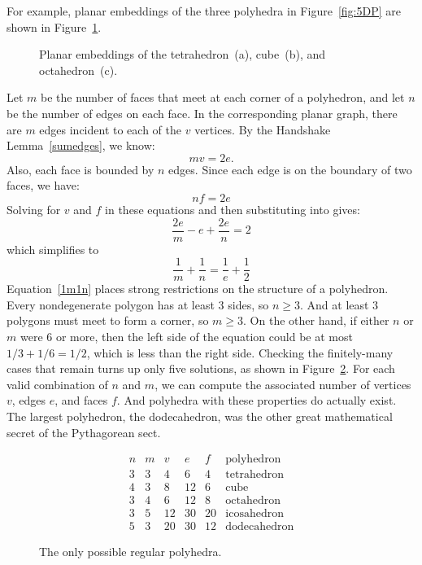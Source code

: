 For example, planar embeddings of the three polyhedra in
Figure~\ref{fig:5DP} are shown in Figure~\ref{fig:5DQ}.

\begin{figure}

\quad
{}
\quad
{}

\caption{Planar embeddings of the tetrahedron~(a), cube~(b), and
  octahedron~(c).}

\label{fig:5DQ}

\end{figure}

Let $m$ be the number of faces that meet at each corner of a
polyhedron, and let $n$ be the number of edges on each face.  In the
corresponding planar graph, there are $m$ edges incident to each of
the $v$ vertices.  By the Handshake Lemma~\ref{sumedges}, we
know:
%
\[
m v = 2 e.
\]
%
Also, each face is bounded by $n$ edges.  Since each edge is on the
boundary of two faces, we have:
%
\[
n f = 2 e
\]
%
Solving for $v$ and $f$ in these equations and then substituting into
 gives:
\[
\frac{2e}{m} - e + \frac{2e}{n} = 2
\]
which simplifies to
\begin{equation}\label{1m1n}
\frac{1}{m} + \frac{1}{n} = \frac{1}{e} + \frac{1}{2}
\end{equation}
%
Equation~\ref{1m1n} places strong restrictions on the structure of a
polyhedron.  Every nondegenerate polygon has at least 3 sides, so $n
\geq 3$.  And at least 3 polygons must meet to form a corner, so $m
\geq 3$.  On the other hand, if either $n$ or $m$ were 6 or more, then
the left side of the equation could be at most $1/3 + 1/6 = 1/2$,
which is less than the right side.  Checking the finitely-many cases
that remain turns up only five solutions, as shown in
Figure~\ref{fig:5DR}.  For each valid combination of $n$ and $m$, we
can compute the associated number of vertices $v$, edges $e$, and
faces $f$.  And polyhedra with these properties do actually exist.
The largest polyhedron, the dodecahedron, was the other great
mathematical secret of the Pythagorean sect.

\begin{figure}\redrawntrue


\[
\begin{array}{cc|ccc|l}
n & m & v  & e  &  f & \text{polyhedron} \\ \hline
3 & 3 & 4  & 6  &  4 & \text{tetrahedron} \\
4 & 3 & 8  & 12 &  6 & \text{cube} \\
3 & 4 & 6  & 12 &  8 & \text{octahedron} \\
3 & 5 & 12 & 30 & 20 & \text{icosahedron} \\
5 & 3 & 20 & 30 & 12 & \text{dodecahedron}
\end{array}
\]

\caption{The only possible regular polyhedra.}

\label{fig:5DR}

\end{figure}

